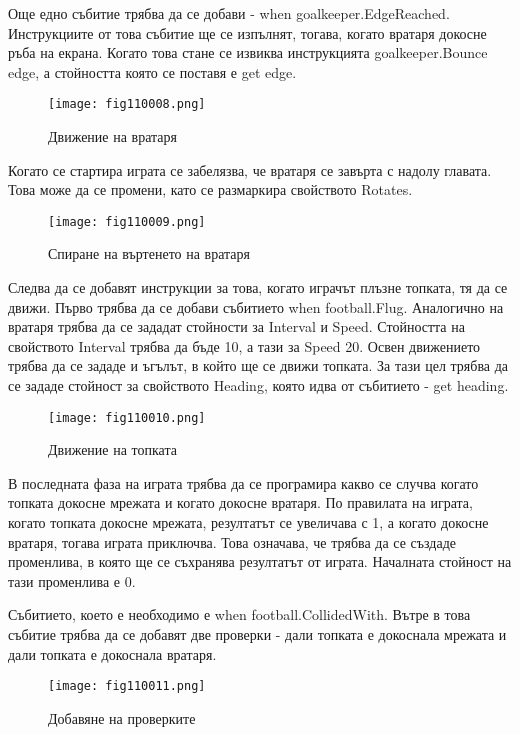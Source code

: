 Още едно събитие трябва да се добави - when goalkeeper.EdgeReached. Инструкциите от това събитие ще се изпълнят, тогава, когато вратаря докосне ръба на екрана. Когато това стане се извиква инструкцията goalkeeper.Bounce edge, а стойността която се поставя е get edge.

\begin{figure}[H]
  \centering
  \texttt{[image: fig110008.png]}
  \caption{Движение на вратаря}
\label{fig110008}
\end{figure}

Когато се стартира играта се забелязва, че вратаря се завърта с надолу главата. Това може да се промени, като се размаркира свойството Rotates.

\begin{figure}[H]
  \centering
  \texttt{[image: fig110009.png]}
  \caption{Спиране на въртенето на вратаря}
\label{fig110009}
\end{figure}

Следва да се добавят инструкции за това, когато играчът плъзне топката, тя да се движи. Първо трябва да се добави събитието when football.Flug. Аналогично на вратаря трябва да се зададат стойности за Interval и Speed. Стойността на свойството Interval трябва да бъде 10, а тази за Speed 20. Освен движението трябва да се зададе и ъгълът, в който ще се движи топката. За тази цел трябва да се зададе стойност за свойството Heading, която идва от събитието - get heading.

\begin{figure}[H]
  \centering
  \texttt{[image: fig110010.png]}
  \caption{Движение на топката}
\label{fig110010}
\end{figure}

В последната фаза на играта трябва да се програмира какво се случва когато топката докосне мрежата и когато докосне вратаря. По правилата на играта, когато топката докосне мрежата, резултатът се увеличава с 1, а когато докосне вратаря, тогава играта приключва. Това означава, че трябва да се създаде променлива, в която ще се съхранява резултатът от играта. Началната стойност на тази променлива е 0.

Събитието, което е необходимо е when football.CollidedWith. Вътре в това събитие трябва да се добавят две проверки - дали топката е докоснала мрежата и дали топката е докоснала вратаря.

\begin{figure}[H]
  \centering
  \texttt{[image: fig110011.png]}
  \caption{Добавяне на проверките}
\label{fig110011}
\end{figure}

